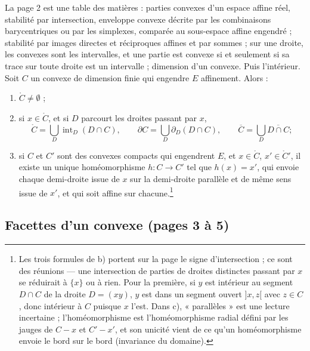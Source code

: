 \documentclass[11pt,a4paper]{article}
\begin{document}
La page 2 est une table des matières : parties convexes d'un espace affine réel,
stabilité par intersection, enveloppe convexe décrite par les combinaisons
barycentriques ou par les simplexes, comparée au sous-espace affine engendré ;
stabilité par images directes et réciproques affines et par sommes ; sur une
droite, les convexes sont les intervalles, et une partie est convexe si et
seulement si sa trace sur toute droite est un intervalle ; dimension d'un
convexe. Puis l'intérieur. Soit $C$ un convexe de dimension finie qui
engendre $E$ affinement. Alors :

\begin{enumerate}
\item[a)] $\mathring{C} \neq \emptyset$ ;
\item[b)] si $x \in \mathring{C}$, et si $D$ parcourt les droites passant par
$x$,
\[
  \mathring{C} = \bigcup_{D} \operatorname{int}_{D}(D \cap C), \qquad
  \partial C = \bigcup_{D} \partial_{D}(D \cap C), \qquad
  \overline{C} = \bigcup_{D} \overline{D \cap C} ;
\]
\item[c)] si $C$ et $C'$ sont des convexes compacts qui engendrent $E$, et
$x \in \mathring{C}$, $x' \in \mathring{C}'$, il existe un unique
homéomorphisme $h : C \to C'$ tel que $h(x) = x'$, qui envoie chaque
demi-droite issue de $x$ sur la demi-droite parallèle et de même sens issue de
$x'$, et qui soit affine sur chacune.\footnote{Les trois formules de b) portent
sur la page le signe d'intersection ; ce sont des réunions --- une intersection
de parties de droites distinctes passant par $x$ se réduirait à $\{x\}$ ou à
rien. Pour la première, si $y$ est intérieur au segment $D \cap C$ de la droite
$D = (xy)$, $y$ est dans un segment ouvert $]x, z[$ avec $z \in C$, donc
intérieur à $C$ puisque $x$ l'est. Dans c), « parallèles » est une lecture
incertaine ; l'homéomorphisme est l'homéomorphisme radial défini par les
jauges de $C - x$ et $C' - x'$, et son unicité vient de ce qu'un homéomorphisme
envoie le bord sur le bord (invariance du domaine).}
\end{enumerate}

\subsection*{Facettes d'un convexe (pages 3 à 5)}
\end{document}
